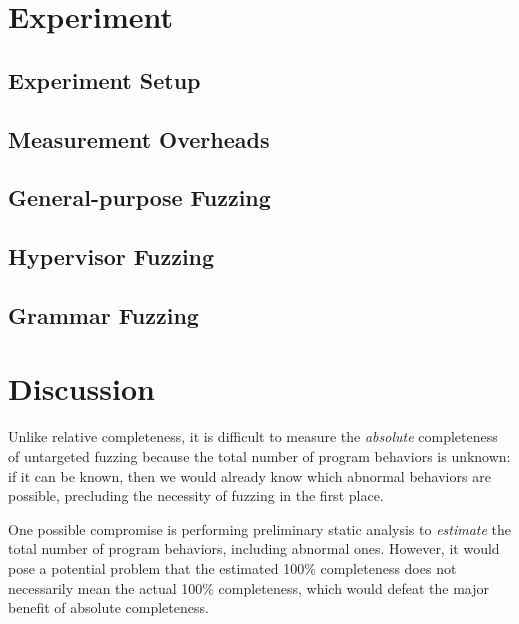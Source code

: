 \documentclass[letterpaper,twocolumn,10pt]{article}
\begin{document}
\section{Experiment}

\subsection{Experiment Setup}

\subsection{Measurement Overheads}

\subsection{General-purpose Fuzzing}

\subsection{Hypervisor Fuzzing}


\subsection{Grammar Fuzzing}



\section{Discussion}
\label{s:disc}

%
Unlike relative completeness, it is difficult to measure the \emph{absolute}
completeness of untargeted fuzzing because the total number of program behaviors
is unknown: if it can be known, then we would already know which abnormal
behaviors are possible, precluding the necessity of fuzzing in the first place.

One possible compromise is performing preliminary static analysis to
\emph{estimate} the total number of program behaviors, including abnormal ones.
However, it would pose a potential problem that the estimated 100\% completeness
does not necessarily mean the actual 100\% completeness, which would defeat the
major benefit of absolute completeness.
\end{document}
